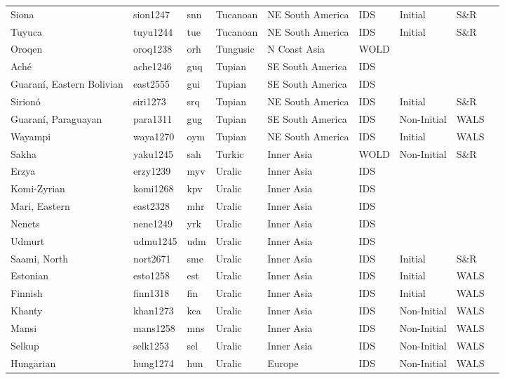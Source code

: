 \begin{longtable}{lllllllll}
  Siona & sion1247 & snn & Tucanoan & NE South America & IDS & Initial & S\&R & \cite[192]{wheeler_siona2000.pdf} \\ 
  Tuyuca & tuyu1244 & tue & Tucanoan & NE South America & IDS & Initial & S\&R & \cite[443]{barnes-malone_tuyuca2000_o.pdf} \\ 
  Oroqen & oroq1238 & orh & Tungusic & N Coast Asia & WOLD &  &  &  \\ 
  Aché & ache1246 & guq & Tupian & SE South America & IDS &  &  &  \\ 
  Guaraní, Eastern Bolivian & east2555 & gui & Tupian & SE South America & IDS &  &  &  \\ 
  Sirionó & siri1273 & srq & Tupian & NE South America & IDS & Initial & S\&R & \cite[125]{dahl_siriono2014_o} \\ 
  Guaraní, Paraguayan & para1311 & gug & Tupian & SE South America & IDS & Non-Initial & WALS &  \\ 
  Wayampi & waya1270 & oym & Tupian & NE South America & IDS & Initial & WALS &  \\ 
  Sakha & yaku1245 & sah & Turkic & Inner Asia & WOLD & Non-Initial & S\&R & \cite[169]{petrova_sakha-yakut2011.pdf} \\ 
  Erzya & erzy1239 & myv & Uralic & Inner Asia & IDS &  &  &  \\ 
  Komi-Zyrian & komi1268 & kpv & Uralic & Inner Asia & IDS &  &  &  \\ 
  Mari, Eastern & east2328 & mhr & Uralic & Inner Asia & IDS &  &  &  \\ 
  Nenets & nene1249 & yrk & Uralic & Inner Asia & IDS &  &  &  \\ 
  Udmurt & udmu1245 & udm & Uralic & Inner Asia & IDS &  &  &  \\ 
  Saami, North & nort2671 & sme & Uralic & Inner Asia & IDS & Initial & S\&R & \cite[244]{infoonpitesaami(initial)-wilbur_pite-saami2014} \\ 
  Estonian & esto1258 & est & Uralic & Inner Asia & IDS & Initial & WALS &  \\ 
  Finnish & finn1318 & fin & Uralic & Inner Asia & IDS & Initial & WALS &  \\ 
  Khanty & khan1273 & kca & Uralic & Inner Asia & IDS & Non-Initial & WALS &  \\ 
  Mansi & mans1258 & mns & Uralic & Inner Asia & IDS & Non-Initial & WALS &  \\ 
  Selkup & selk1253 & sel & Uralic & Inner Asia & IDS & Non-Initial & WALS &  \\ 
  Hungarian & hung1274 & hun & Uralic & Europe & IDS & Non-Initial & WALS &  \\ 

\end{longtable}
